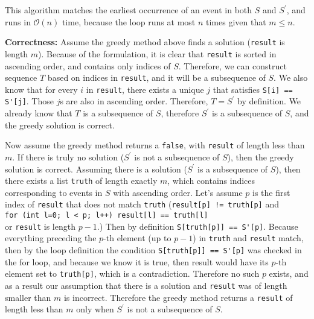 \documentclass[12pt, letterpaper]{article}
\begin{document}
This algorithm matches the earliest occurrence of an event in both $S$ and $S^\prime$, and runs in $\mathcal{O}(n)$ time, because the loop runs at most $n$ times given that $m \leq n$.

\noindent\textbf{Correctness:}
Assume the greedy method above finds a solution (\verb|result| is length $m$).
Because of the formulation, it is clear that \verb|result| is sorted in ascending order, and contains only indices of $S$.
Therefore, we can construct sequence $T$ based on indices in \verb|result|, and it will be a subsequence of $S$.
We also know that for every $i$ in \verb|result|, there exists a unique $j$ that satisfies \verb|S[i] == S'[j]|.
Those $j$s are also in ascending order.
Therefore, $T = S^\prime$ by definition.
We already know that $T$ is a subsequence of $S$, therefore $S^\prime$ is a subsequence of $S$, and the greedy solution is correct.

Now assume the greedy method returns a \verb|false|, with \verb|result| of length less than $m$.
If there is truly no solution ($S^\prime$ is not a subsequence of $S$), then the greedy solution is correct.
Assuming there is a solution ($S^\prime$ is a subsequence of $S$), then there exists a list \verb|truth| of length exactly $m$, which contains indices corresponding to events in $S$ with ascending order.
Let's assume $p$ is the first index of \verb|result| that does not match \verb|truth| (\verb|result[p] != truth[p]| and \\\verb|for (int l=0; l < p; l++) result[l] == truth[l]|\\ or \verb|result| is length $p-1$.)
Then by definition \verb|S[truth[p]] == S'[p]|.
Because everything preceding the $p$-th element (up to $p-1$) in \verb|truth| and \verb|result| match, then by the loop definition the condition 
\verb|S[truth[p]] == S'[p]| was checked in the for loop, and because we know it is true, 
then result would have its $p$-th element set to \verb|truth[p]|, which is a contradiction.
Therefore no such $p$ exists, and as a result our assumption that there is a solution and \verb|result| was of length smaller than $m$ is incorrect.
Therefore the greedy method returns a \verb|result| of length less than $m$ only when $S^\prime$ is not a subsequence of $S$.



\clearpage
\end{document}
